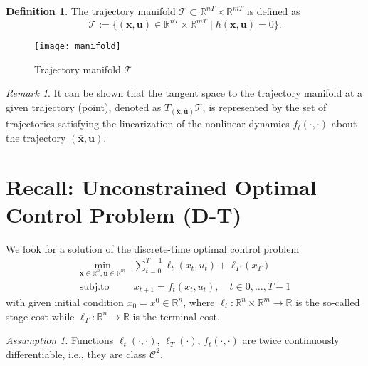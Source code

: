 \documentclass[openany]{book}
\theoremstyle{definition}
\newtheorem{definition}{Definition}[section]
\theoremstyle{remark}
\newtheorem*{remark}{Remark}
\newtheorem*{assumption}{Assumption}
\begin{document}
\begin{definition}
The trajectory manifold $\mathcal{T} \subset \mathbb{R}^{nT} \times \mathbb{R}^{mT}$ is defined as
\[
    \mathcal{T} := \{(\mathbf{x}, \mathbf{u}) \in \mathbb{R}^{nT} \times \mathbb{R}^{mT} \mid h(\mathbf{x}, \mathbf{u}) = 0\}.
\]
\end{definition}

\begin{figure}[ht]
    \centering
    \texttt{[image: manifold]}
    \caption{Trajectory manifold $\mathcal{T}$}
\end{figure}

\begin{remark}
It can be shown that the tangent space to the trajectory manifold at a given trajectory (point), denoted as $T_{(\bar{\mathbf{x}},\bar{\mathbf{u}})}\mathcal{T}$, is represented by the set of trajectories satisfying the linearization of the nonlinear dynamics $f_t(\cdot,\cdot)$ about the trajectory $(\bar{\mathbf{x}}, \bar{\mathbf{u}})$.
\end{remark}

\section{Recall: Unconstrained Optimal Control Problem (D-T)}

We look for a solution of the discrete-time optimal control problem
\begin{align}
    \min_{\mathbf{x}\in\mathbb{R}^n,\mathbf{u}\in\mathbb{R}^m} & \sum_{t=0}^{T-1}\ell_t(x_t,u_t)+\ell_T(x_T) \\
    \text{subj.to } & x_{t+1} = f_t(x_t,u_t), \quad t \in 0,\ldots,T-1
\end{align}
with given initial condition $x_0 = x^0 \in \mathbb{R}^n$, where $\ell_t : \mathbb{R}^n \times \mathbb{R}^m \to \mathbb{R}$ is the so-called stage cost while $\ell_T : \mathbb{R}^n \to \mathbb{R}$ is the terminal cost.

\begin{assumption}
Functions $\ell_t(\cdot,\cdot)$, $\ell_T(\cdot)$, $f_t(\cdot,\cdot)$ are twice continuously differentiable, i.e., they are class $\mathcal{C}^2$.
\end{assumption}
\end{document}
